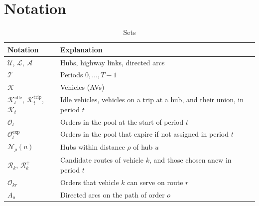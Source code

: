 \documentclass[12pt]{article}
\theoremstyle{plain}
\theoremstyle{definition}
\newcommand{\Kidle}{\mathcal{K}^{\mathrm{idle}}_t}
\newcommand{\Ktrip}{\mathcal{K}^{\mathrm{trip}}_t}
\newcommand{\Kdec}{\mathcal{K}_t}
\newcommand{\Oexp}{\mathcal{O}^{\mathrm{exp}}_t}
\begin{document}
\appendix

\section{Notation}

\begin{table}[h]
    \centering
    \begin{tabular}{l p{}}
        \toprule
        Notation & Explanation \\
        \midrule
        $\mathcal{U}$, $\mathcal{L}$, $\mathcal{A}$ & Hubs, highway links, directed arcs\\
        $\mathcal{T}$ & Periods $0,\dots,T-1$\\
        $\mathcal{K}$ & Vehicles (AVs)\\
        $\Kidle$, $\Ktrip$, $\Kdec$ & Idle vehicles, vehicles on a trip at a hub, and their union, in period $t$\\
        $\mathcal{O}_t$ & Orders in the pool at the start of period $t$\\
        $\Oexp$ & Orders in the pool that expire if not assigned in period $t$\\
        $\mathcal{N}_\rho(u)$ & Hubs within distance $\rho$ of hub $u$\\
        $\mathcal{R}_k$, $\mathcal{R}^{+}_k$ & Candidate routes of vehicle $k$, and those chosen anew in period $t$\\
        $\mathcal{O}_{kr}$ & Orders that vehicle $k$ can serve on route $r$\\
        $A_o$ & Directed arcs on the path of order $o$\\
        \bottomrule
    \end{tabular}
    \caption{Sets}
    \label{tab:sets}
\end{table}
\end{document}
